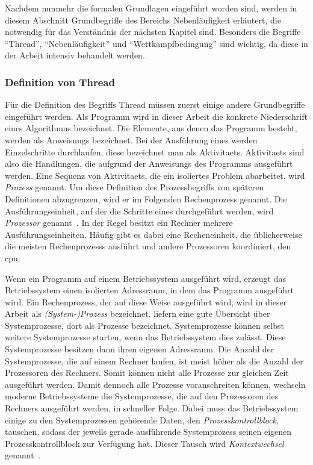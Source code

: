 Nachdem nunmehr die formalen Grundlagen eingeführt worden sind, werden in diesem Abschnitt Grundbegriffe des Bereichs Nebenläufigkeit erläutert, die notwendig für das Verständnis der nächsten Kapitel sind. Besonders die Begriffe \enquote{Thread}, \enquote{Nebenläufigkeit} und \enquote{Wettkampfbedingung} sind wichtig, da diese in der Arbeit intensiv behandelt werden.


\subsubsection{Definition von Thread}
Für die Definition des Begriffs Thread müssen zuerst einige andere Grundbegriffe eingeführt werden. 
Als \gls{Programm} wird in dieser Arbeit die konkrete Niederschrift eines Algorithmus bezeichnet. Die Elemente, aus denen das \gls{Programm} besteht, werden als \glspl{Anweisung} bezeichnet. Bei der Ausführung eines  werden Einzelschritte durchlaufen, diese bezeichnet man als \glspl{Aktivitaet}. \glspl{Aktivitaet} sind also die Handlungen, die aufgrund der \glspl{Anweisung} des Programms ausgeführt werden. Eine Sequenz von \glspl{Aktivitaet}, die ein isoliertes Problem abarbeitet, wird \emph{Prozess} genannt. Um diese Definition des Prozessbegriffs von späteren Definitionen abzugrenzen, wird er im Folgenden \gls{Rechenprozess} genannt. Die Ausführungseinheit, auf der die Schritte eines  durchgeführt werden, wird \emph{Prozessor} genannt~\cite[S.~22]{Herrtwich1989}. In der Regel besitzt ein Rechner mehrere Ausführungseinheiten. Häufig gibt es dabei eine Recheneinheit, die üblicherweise die meisten \glspl{Rechenprozess} ausführt und andere Prozessoren koordiniert, den \ac{cpu}.

Wenn ein \gls{Programm} auf einem Betriebssystem ausgeführt wird, erzeugt das Betriebssystem einen isolierten Adressraum, in dem das \gls{Programm} ausgeführt wird. Ein \gls{Rechenprozess}, der auf diese Weise ausgeführt wird, wird in dieser Arbeit als \emph{(System-)Prozess} bezeichnet. \textcite[S.~125~\psqq]{Tanenbaum2016} liefern eine gute Übersicht über Systemprozesse, dort als Prozesse bezeichnet. Systemprozesse können selbst weitere Systemprozesse starten, wenn das Betriebssystem dies zulässt. Diese Systemprozesse besitzen dann ihren eigenen Adressraum. Die Anzahl der Systemprozesse, die auf einem Rechner laufen, ist meist höher als die Anzahl der Prozessoren des Rechners. Somit können nicht alle Prozesse zur gleichen Zeit ausgeführt werden. Damit dennoch alle Prozesse voranschreiten können, wechseln moderne Betriebssysteme die Systemprozesse, die auf den Prozessoren des Rechners ausgeführt werden, in schneller Folge. Dabei muss das Betriebssystem einige zu den Systemprozessen gehörende Daten, den \emph{Prozesskontrollblock}, tauschen, sodass der jeweils gerade ausführende Systemprozess seinen eigenen Prozesskontrollblock zur Verfügung hat. Dieser Tausch wird \emph{Kontextwechsel} genannt~\cite[S.~59]{Tanenbaum2016}.

